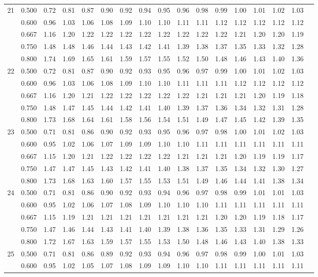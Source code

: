 {\begin{center}
\begin{tabular}{rrr@{\,}r@{\,}r@{\,}r@{\,}r@{\,}r@{\,}r@{\,}r
                   @{\,}r@{\,}r@{\,}r@{\,}r@{\,}r@{\,}r@{\,}r}
21&0.500&0.72&0.81&0.87&0.90&0.92&0.94&0.95&0.96&0.98&0.99&1.00&1.01&1.02&1.03\\
  &0.600&0.96&1.03&1.06&1.08&1.09&1.10&1.10&1.11&1.11&1.12&1.12&1.12&1.12&1.12\\
  &0.667&1.16&1.20&1.22&1.22&1.22&1.22&1.22&1.22&1.22&1.22&1.21&1.20&1.20&1.19\\
  &0.750&1.48&1.48&1.46&1.44&1.43&1.42&1.41&1.39&1.38&1.37&1.35&1.33&1.32&1.28\\
  &0.800&1.74&1.69&1.65&1.61&1.59&1.57&1.55&1.52&1.50&1.48&1.46&1.43&1.40&1.36\\
22&0.500&0.72&0.81&0.87&0.90&0.92&0.93&0.95&0.96&0.97&0.99&1.00&1.01&1.02&1.03\\
  &0.600&0.96&1.03&1.06&1.08&1.09&1.10&1.10&1.11&1.11&1.11&1.12&1.12&1.12&1.12\\
  &0.667&1.16&1.20&1.21&1.22&1.22&1.22&1.22&1.22&1.21&1.21&1.21&1.20&1.19&1.18\\
  &0.750&1.48&1.47&1.45&1.44&1.42&1.41&1.40&1.39&1.37&1.36&1.34&1.32&1.31&1.28\\
  &0.800&1.73&1.68&1.64&1.61&1.58&1.56&1.54&1.51&1.49&1.47&1.45&1.42&1.39&1.35\\
23&0.500&0.71&0.81&0.86&0.90&0.92&0.93&0.95&0.96&0.97&0.98&1.00&1.01&1.02&1.03\\
  &0.600&0.95&1.02&1.06&1.07&1.09&1.09&1.10&1.10&1.11&1.11&1.11&1.11&1.11&1.11\\
  &0.667&1.15&1.20&1.21&1.22&1.22&1.22&1.22&1.21&1.21&1.21&1.20&1.19&1.19&1.17\\
  &0.750&1.47&1.47&1.45&1.43&1.42&1.41&1.40&1.38&1.37&1.35&1.34&1.32&1.30&1.27\\
  &0.800&1.73&1.68&1.63&1.60&1.57&1.55&1.53&1.51&1.49&1.46&1.44&1.41&1.38&1.34\\
24&0.500&0.71&0.81&0.86&0.90&0.92&0.93&0.94&0.96&0.97&0.98&0.99&1.01&1.01&1.03\\
  &0.600&0.95&1.02&1.06&1.07&1.08&1.09&1.10&1.10&1.10&1.11&1.11&1.11&1.11&1.11\\
  &0.667&1.15&1.19&1.21&1.21&1.21&1.21&1.21&1.21&1.21&1.20&1.20&1.19&1.18&1.17\\
  &0.750&1.47&1.46&1.44&1.43&1.41&1.40&1.39&1.38&1.36&1.35&1.33&1.31&1.29&1.26\\
  &0.800&1.72&1.67&1.63&1.59&1.57&1.55&1.53&1.50&1.48&1.46&1.43&1.40&1.38&1.33\\
25&0.500&0.71&0.81&0.86&0.89&0.92&0.93&0.94&0.96&0.97&0.98&0.99&1.00&1.01&1.03\\
  &0.600&0.95&1.02&1.05&1.07&1.08&1.09&1.09&1.10&1.10&1.11&1.11&1.11&1.11&1.11\\

\end{tabular}
\end{center}}
